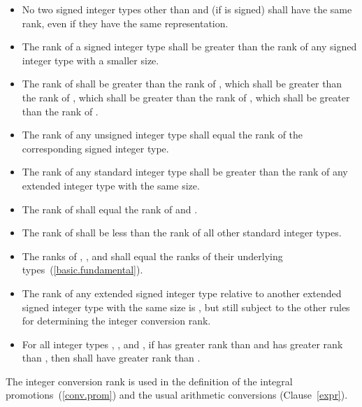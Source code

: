 \begin{itemize}
\item No two signed integer types other than  and  (if  is signed) shall have the same rank, even if they have
the same representation.

\item The rank of a signed integer type shall be greater than the rank
of any signed integer type with a smaller size.

\item The rank of  shall be greater
than the rank of , which shall be greater than
the rank of , which shall be greater than the rank of
, which shall be greater than the rank of
.

\item The rank of any unsigned integer type shall equal the rank of the
corresponding signed integer type.

\item The rank of any standard integer type shall be greater than the
rank of any extended integer type with the same size.

\item The rank of  shall equal the rank of 
and .

\item The rank of  shall be less than the rank of all other
standard integer types.

%
%
%
\item The ranks of , , and
 shall equal the ranks of their underlying
types~(\ref{basic.fundamental}).

\item The rank of any extended signed integer type relative to another
extended signed integer type with the same size is , but still subject to the other rules for determining the integer
conversion rank.

\item For all integer types , , and , if
 has greater rank than  and  has greater
rank than , then  shall have greater rank than
.
\end{itemize}

\begin{note}
The integer conversion rank is used in the definition of the integral
promotions~(\ref{conv.prom}) and the usual arithmetic
conversions (Clause~\ref{expr}).
\end{note}%
